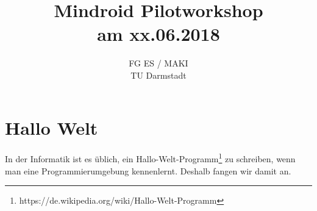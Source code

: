 \documentclass[
	12pt,
	article,
	type=bsc, %
	colorbacktitle,
	instlogo,
	accentcolor=tud1c,
	german,
	twoside
]{tudexercise}
\begin{document}
  \author{}
	
	\title{Mindroid Pilotworkshop \\ am xx.06.2018}
	
	\subtitle{FG ES / MAKI \\ TU Darmstadt}
	\subsubtitle{}
	
	\maketitle
	
	
	
	\section{Hallo Welt}
	In der Informatik ist es üblich, ein Hallo-Welt-Programm\footnote{https://de.wikipedia.org/wiki/Hallo-Welt-Programm} zu schreiben, wenn man eine Programmierumgebung kennenlernt. Deshalb fangen wir damit an.
	
\end{document}
